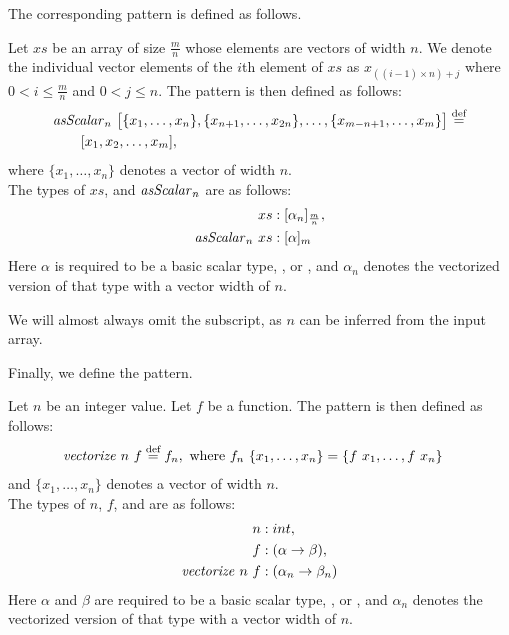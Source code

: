 \noindent
The corresponding \asScalar pattern is defined as follows.
\begin{definition}
  \label{definition:pattern:asScalar}
  Let $xs$ be an array of size $\frac{m}{n}$ whose elements are vectors of width $n$.
  We denote the individual vector elements of the $i$th element of $xs$ as $x_{((i-1)\times n)+j}$ where $0 < i \leq \frac{m}{n}$ and $0 < j \leq n$.
  The \asScalar pattern is then defined as follows:
  \begin{align*}
    &\text{\textit{asScalar}}_n\ \big[\{x_1, \ldots, x_n\}, \{x_{n+1}, \ldots, x_{2n}\}, \ldots, \{x_{m-n+1}, \ldots, x_m\}\big] \stackrel{\textrm{\scriptsize def}}{=}\\
    &\qquad [x_1, x_2, \dots, x_m],
  \end{align*}
  where $\{x_1,\ldots,x_n\}$ denotes a vector of width $n$.\\
  The types of $xs$, and $\text{\textit{asScalar}}_n$ are as follows:
  \begin{align*}
    xs &: [\alpha_n]_{\frac{m}{n}},\\
    \text{\textit{asScalar}}_n\ xs &: [\alpha]_m
  \end{align*}
  Here $\alpha$ is required to be a basic scalar type, \eg,  or , and $\alpha_n$ denotes the vectorized version of that type with a vector width of $n$.
\end{definition}

We will almost always omit the subscript, as $n$ can be inferred from the input array.

\noindent
Finally, we define the \vect pattern.
\begin{definition}
  \label{definition:pattern:vect}
  Let $n$ be an integer value.
  Let $f$ be a function.
  The \vect pattern is then defined as follows:
  \begin{align*}
    \text{\textit{vectorize}}\ n\ f &\stackrel{\textrm{\scriptsize def}}{=} f_n, \text{ where } f_n\ \{x_1, \ldots, x_n\} = \{f\ x_1, \ldots, f\ x_n \}
  \end{align*}
  and $\{x_1,\ldots,x_n\}$ denotes a vector of width $n$.\\
  The types of $n$, $f$, and \vect are as follows:
  \begin{align*}
    n &: int,\\
    f &: (\alpha \rightarrow \beta),\\
    \text{\textit{vectorize}}\ n\ f &: (\alpha_n \rightarrow \beta_n)
  \end{align*}
  Here $\alpha$ and $\beta$ are required to be a basic scalar type, \eg,  or , and $\alpha_n$ denotes the vectorized version of that type with a vector width of $n$.
\end{definition}

